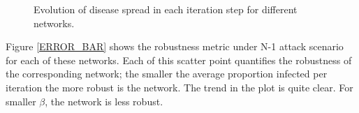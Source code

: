 \documentclass[11pt]{article}
\begin{document}
\begin{figure}[!htb]
\centering
{}
\caption{Evolution of disease spread in each iteration step for different networks.}\label{EVOLUTION}
\end{figure}
Figure \ref{ERROR_BAR} shows the robustness metric under N-1 attack scenario for each of these networks. Each of this scatter point quantifies the robustness of the corresponding network; the smaller the average proportion infected per iteration the more robust is the network. The trend in the plot is quite clear. For smaller $\beta$, the network is less robust. 
\end{document}
